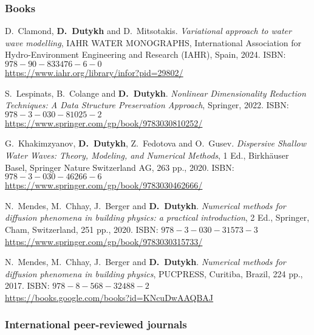 \separator
\subsubsection{Books}

\begin{etaremune}

  \item D.~Clamond, \textbf{D.~Dutykh} and D.~Mitsotakis. \textit{Variational approach to water wave modelling}, IAHR WATER MONOGRAPHS, International Association for Hydro-Environment Engineering and Research (IAHR), Spain, 2024. ISBN: $978-90-833476-6-0$ \\
  \url{https://www.iahr.org/library/infor?pid=29802/}

  \item S.~Lespinats, B.~Colange and \textbf{D.~Dutykh}. \textit{Nonlinear Dimensionality Reduction Techniques: A Data Structure Preservation Approach}, Springer, 2022. ISBN: $978-3-030-81025-2$ \\
  \url{https://www.springer.com/gp/book/9783030810252/}

  \item G.~Khakimzyanov, \textbf{D.~Dutykh}, Z.~Fedotova and O.~Gusev. \textit{Dispersive Shallow Water Waves: Theory, Modeling, and Numerical Methods}, 1 Ed., Birkh\"auser Basel, Springer Nature Switzerland AG, 263 pp., 2020. ISBN: $978-3-030-46266-6$ \\
  \url{https://www.springer.com/gp/book/9783030462666/}

  \item N.~Mendes, M.~Chhay, J.~Berger and \textbf{D.~Dutykh}. \textit{Numerical methods for diffusion phenomena in building physics: a practical introduction}, 2 Ed., Springer, Cham, Switzerland, 251 pp., 2020. ISBN: $978-3-030-31573-3$ \\
  \url{https://www.springer.com/gp/book/9783030315733/}

  \item N.~Mendes, M.~Chhay, J.~Berger and \textbf{D.~Dutykh}. \textit{Numerical methods for diffusion phenomena in building physics}, PUCPRESS, Curitiba, Brazil, 224 pp., 2017. ISBN: $978-8-568-32488-2$ \\
  \url{https://books.google.com/books?id=KNcuDwAAQBAJ}
  
\end{etaremune}

\separator
\subsubsection{International peer-reviewed journals}

